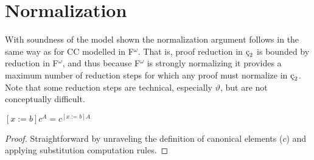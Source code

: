 \section{Normalization}

With soundness of the model shown the normalization argument follows in the same way as for CC modelled in F$^\omega$.
That is, proof reduction in $\ced$ is bounded by reduction in F$^\omega$, and thus because F$^\omega$ is strongly normalizing it provides a maximum number of reduction steps for which any proof must normalize in $\ced$.
Note that some reduction steps are technical, especially $\vartheta$, but are not conceptually difficult.

\begin{lemma}
    \label{lem:3:canonical_subst}
    $[x := b]c^A = c^{[x := b]A}$
\end{lemma}
\begin{proof}
    Straightforward by unraveling the definition of canonical elements ($c$) and applying substitution computation rules.
\end{proof}

